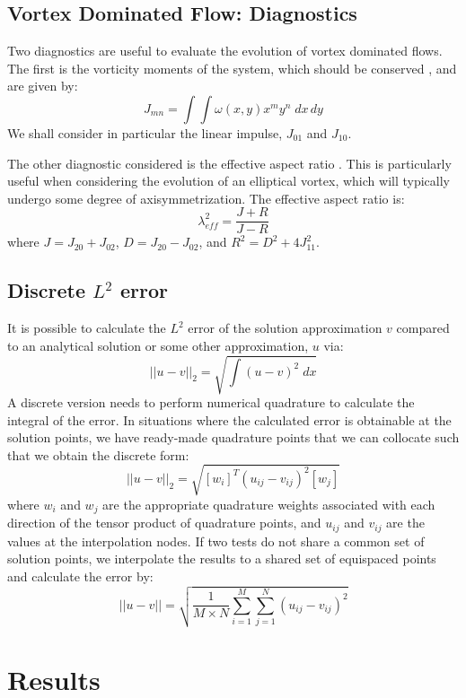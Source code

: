 \documentclass[]{aiaa-tc}%
\newcommand{\be}{\begin{equation}}
\newcommand{\ee}{\end{equation}}
\begin{document}
\subsection{Vortex Dominated Flow: Diagnostics}
Two diagnostics are useful to evaluate the evolution of vortex dominated flows. The first is the vorticity moments of the system, which should be conserved \cite{Koum1997}, and are given by:
\be J_{mn}=\int\int \omega(x,y)x^my^n \; dx\,dy \ee
We shall consider in particular the linear impulse, $J_{01}$ and $J_{10}$.

The other diagnostic considered is the effective aspect ratio \cite{Koum1997}. This is particularly useful when considering the evolution of an elliptical vortex, which will typically undergo some degree of axisymmetrization. The effective aspect ratio is:
\be \lambda_{eff}^2 = \frac{J+R}{J-R} \ee
where $J=J_{20}+J_{02}$, $D=J_{20}-J_{02}$, and $R^2=D^2+4J_{11}^2$.

\subsection{Discrete $L^2$ error}
It is possible to calculate the $L^2$ error of the solution approximation $v$ compared to an analytical solution or some other approximation, $u$ via:
\be ||u-v||_2 = \sqrt{\int (u-v)^2 \; dx} \ee
A discrete version needs to perform numerical quadrature to calculate the integral of the error. In situations where the calculated error is obtainable at the solution points, we have ready-made quadrature points that we can collocate such that we obtain the discrete form:
\be ||u-v||_2 = \sqrt{[w_i]^T(u_{ij}-v_{ij})^2[w_j]} \ee
where $w_i$ and $w_j$ are the appropriate quadrature weights associated with each direction of the tensor product of quadrature points, and $u_{ij}$ and $v_{ij}$ are the values at the interpolation nodes. If two tests do not share a common set of solution points, we interpolate the results to a shared set of equispaced points and calculate the error by:
\be ||u-v|| =\sqrt{\frac{1}{M\times N} \sum_{i=1}^M \sum_{j=1}^N (u_{ij}-v_{ij})^2 }\ee

\section{Results}
\end{document}
